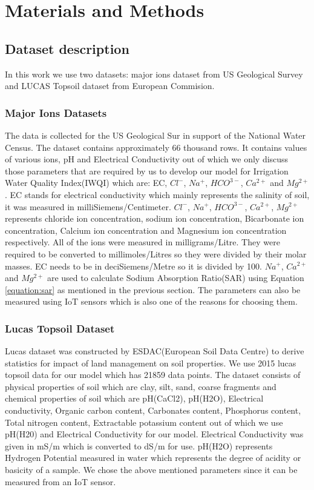 \section{Materials and Methods}
\label{section:materialAndMethods}

\subsection{Dataset description}
\label{subsection:datasets}
In this work we use two datasets: major ions dataset from US Geological Survey\cite{dataset:majorIons} and LUCAS Topsoil dataset\cite{dataset:lucas} from European Commision.

\subsubsection{Major Ions Datasets}
\label{subsubsection:majorIons}
The data is collected for the US Geological Sur\cite{dataset:majorIons} in support of the National Water Census. The dataset contains approximately 66 thousand rows. It contains values of various ions, pH and Electrical Conductivity out of which we only discuss those parameters that are required by us to develop our model for Irrigation Water Quality Index(IWQI) which are: EC, $Cl^-$, $Na^+$, $HCO^{3-}$, $Ca^{2+}$ and $Mg^{2+}$. EC stands for electrical conductivity which mainly represents the salinity of soil, it was measured in milliSiemens/Centimeter. $Cl^-$, $Na^+$, $HCO^{3-}$, $Ca^{2+}$, $Mg^{2+}$ represents chloride ion concentration, sodium ion concentration, Bicarbonate ion concentration, Calcium ion concentration and Magnesium ion concentration respectively. All of the ions were measured in milligrams/Litre. They were required to be converted to millimoles/Litres so they were divided by their molar masses. EC needs to be in deciSiemens/Metre so it is divided by 100. $Na^+$, $Ca^{2+}$ and $Mg^{2+}$ are used to calculate Sodium Absorption Ratio(SAR) using Equation \ref{equation:sar} as mentioned in the previous section. The parameters can also be measured using IoT sensors which is also one of the reasons for choosing them. 

\subsubsection{Lucas Topsoil Dataset}
\label{subsubsection:lucas}
Lucas dataset  was constructed by ESDAC(European Soil Data Centre) to derive statistics for impact of land management on soil properties\cite{dataset:lucas}. We use 2015 lucas topsoil data for our model which has 21859 data points. The dataset consists of physical properties of soil which are clay, silt, sand, coarse fragments and chemical properties of soil which are pH(CaCl2), pH(H2O), Electrical conductivity, Organic carbon content, Carbonates content, Phosphorus content, Total nitrogen content, Extractable potassium content out of which we use pH(H20) and Electrical Conductivity for our model. Electrical Conductivity was given in mS/m which is converted to dS/m for use. pH(H2O) represents Hydrogen Potential measured in water which represents the degree of acidity or basicity of a sample. We chose the above mentioned parameters since it can be measured from an IoT sensor. 

